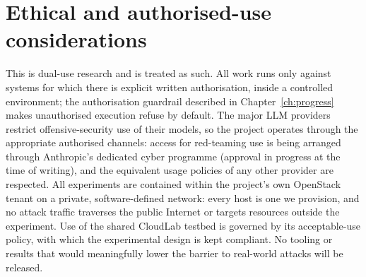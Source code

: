 \documentclass[12pt,oneside]{report}
\begin{document}
\section{Ethical and authorised-use considerations}
This is dual-use research and is treated as such. All work runs only against
systems for which there is explicit written authorisation, inside a controlled
environment; the authorisation guardrail described in
Chapter~\ref{ch:progress} makes unauthorised execution refuse by default. The
major LLM providers restrict offensive-security use of their models, so the
project operates through the appropriate authorised channels: access for
red-teaming use is being arranged through Anthropic's dedicated cyber programme
(approval in progress at the time of writing), and the equivalent usage policies
of any other provider are respected. All
experiments are contained within the project's own OpenStack tenant on a private,
software-defined network: every host is one we provision, and no attack traffic
traverses the public Internet or targets resources outside the experiment. Use
of the shared CloudLab testbed is governed by its acceptable-use policy, with
which the experimental design is kept compliant. No tooling or results that
would meaningfully lower the barrier to real-world attacks will be released.



\end{document}
